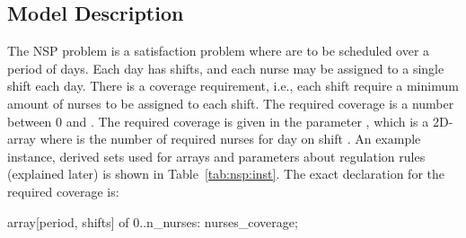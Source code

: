 \documentclass[a4paper,12pt]{article}
\begin{document}
\subsection{Model Description}
The NSP problem is a satisfaction problem where  are to be scheduled over a
period of  days. Each day has  shifts, and each nurse may be
assigned to a single shift each day. There is a coverage requirement, i.e., each shift
require a minimum amount of nurses to be assigned to each shift. The required coverage is
a number between 0 and . The required coverage is given in the parameter
, which is a 2D-array where  is the number of
required nurses for day  on shift . An example instance, derived sets used for
arrays and parameters about regulation rules (explained later) is shown in
Table~\ref{tab:nsp:inst}. The exact declaration for the required coverage is:
\begin{mznnobreak}
array[period, shifts] of 0..n_nurses: nurses_coverage;
\end{mznnobreak}
\end{document}
